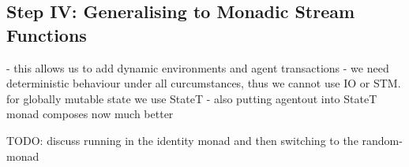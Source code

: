 \subsection{Step IV: Generalising to Monadic Stream Functions}
- this allows us to add dynamic environments and agent transactions
- we need deterministic behaviour under all curcumstances, thus we cannot use IO or STM. for globally mutable state we use StateT
- also putting agentout into StateT monad composes now much better

TODO: discuss running in the identity monad and then switching to the random-monad